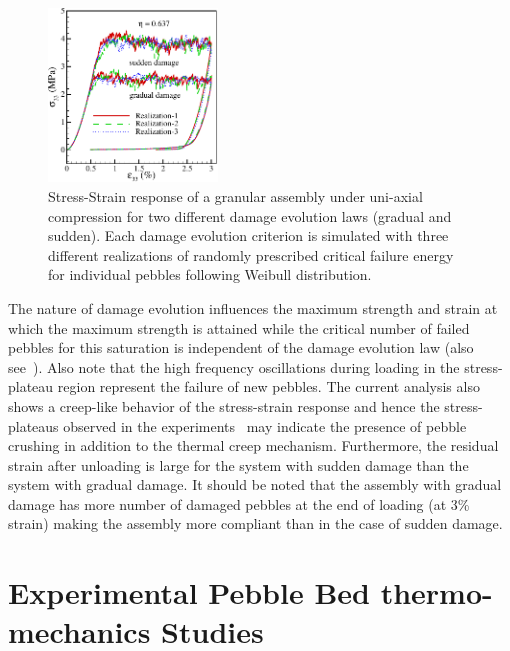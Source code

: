 \begin{figure}[!ht]
\begin{center}
\includegraphics[width=0.4\textwidth]{chapters/figures/Fig-5}
\end{center}
\caption{Stress-Strain response of a granular assembly under uni-axial compression for two different damage evolution laws (gradual and sudden). Each damage evolution criterion is simulated with three different realizations of randomly prescribed critical failure energy for individual pebbles following Weibull distribution.}
\label{fig:stress-strain-effect}
\end{figure}

The nature of damage evolution influences the maximum strength and strain at which the maximum strength is attained while the critical number of failed pebbles for this saturation is independent of the damage evolution law (also see~\cite{Zhao2010}). Also note that the high frequency oscillations during loading in the stress-plateau region represent the failure of new pebbles. The current analysis also shows a creep-like behavior of the stress-strain response and hence the stress-plateaus observed in the experiments~\cite{Reimann:2000tw} may indicate the presence of pebble crushing in addition to the thermal creep mechanism. Furthermore, the residual strain after unloading is large for the system with sudden damage than the system with gradual damage. It should be noted that the assembly with gradual damage has more number of damaged pebbles at the end of loading (at 3\% strain) making the assembly more compliant than in the case of sudden damage. 












\section{Experimental Pebble Bed thermo-mechanics Studies}
